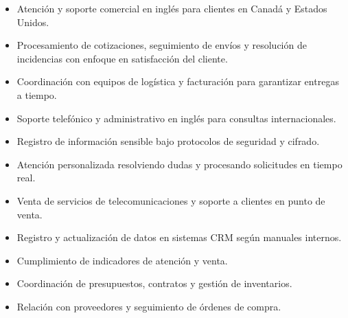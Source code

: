 \documentclass[11pt, a4paper]{awesome-cv}
\begin{document}
\begin{itemize}
  \item Atención y soporte comercial en inglés para clientes en Canadá y Estados Unidos.
  \item Procesamiento de cotizaciones, seguimiento de envíos y resolución de incidencias con enfoque en satisfacción del cliente.
  \item Coordinación con equipos de logística y facturación para garantizar entregas a tiempo.
\end{itemize}

\begin{itemize}
  \item Soporte telefónico y administrativo en inglés para consultas internacionales.
  \item Registro de información sensible bajo protocolos de seguridad y cifrado.
  \item Atención personalizada resolviendo dudas y procesando solicitudes en tiempo real.
\end{itemize}

\begin{itemize}
  \item Venta de servicios de telecomunicaciones y soporte a clientes en punto de venta.
  \item Registro y actualización de datos en sistemas CRM según manuales internos.
  \item Cumplimiento de indicadores de atención y venta.
\end{itemize}


\begin{itemize}
  \item Coordinación de presupuestos, contratos y gestión de inventarios.
  \item Relación con proveedores y seguimiento de órdenes de compra.
\end{itemize}
\end{document}
